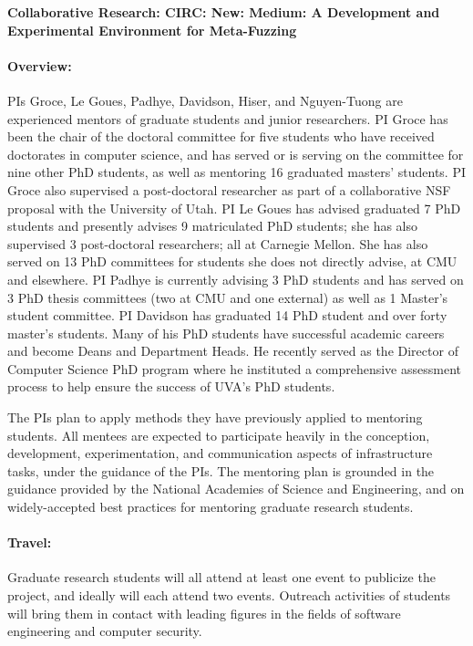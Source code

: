 \documentclass[12pt]{article}
\begin{document}

\begin{center}
{\Large\sf\textbf{Collaborative Research: CIRC: New: Medium: A Development and 
Experimental Environment for Meta-Fuzzing}}
\end{center}

\paragraph{Overview:} PIs Groce, Le Goues, Padhye, Davidson, Hiser, and Nguyen-Tuong are experienced mentors of graduate students and junior researchers. PI Groce has been the chair of the doctoral committee for five students who have received doctorates in computer science, and has served or is serving on the committee for nine other PhD students, as well as mentoring 16 graduated masters' students. PI Groce also supervised a post-doctoral researcher as part of a collaborative NSF proposal with the University of Utah.  PI Le Goues has advised graduated 7 PhD students and presently advises 9 matriculated PhD students; she has also supervised 3 post-doctoral researchers; all at Carnegie Mellon.  She has also served on 13 PhD committees for students she does not directly advise, at CMU and elsewhere. PI Padhye is currently advising 3 PhD students and has served on 3 PhD thesis committees (two at CMU and one external) as well as 1 Master's student committee.
PI Davidson has graduated 14 PhD student and over forty master's students.
Many of his PhD students have successful academic careers and become Deans and Department Heads.
He recently served as the Director of Computer Science PhD program where he instituted a comprehensive assessment process to help ensure the success of UVA's PhD students.


The PIs plan to apply methods they have previously applied to mentoring students. All mentees are expected to participate heavily in the conception, development, experimentation, and communication aspects of infrastructure tasks, under the guidance of the PIs. The mentoring plan is grounded in the guidance provided by the National Academies of Science
and Engineering, and on widely-accepted best practices for mentoring graduate research students.


\paragraph{Travel:}  Graduate research students will all attend at least one event to  publicize the project, and ideally will each attend two events.  Outreach activities of students will bring them in contact with leading figures in the fields of software engineering and computer security.
\end{document}
